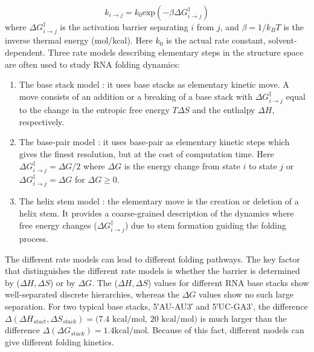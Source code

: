 \begin{equation}
\label{Eq:arrhenius}
k_{i \rightarrow j} = k_0 \text{exp}(-\beta  \Delta G^{\ddagger}_{i\rightarrow j})
\end{equation}
where \(\Delta G^{\ddagger}_{i \rightarrow j}\) is the activation barrier separating \(i\) from \(j\), and \(\beta=1/k_BT\) is the inverse thermal energy (mol/kcal). 
Here \(k_0\) is the actual rate constant, solvent-dependent. Three rate models describing elementary steps in the structure space are often used to study \ac{RNA} folding dynamics: 
\begin{enumerate}
	\item The base stack model \cite{zhang02_rna_hairp_foldin_kinet,zhang2003analyzing,zhang2006exploring}: it uses base stacks as elementary kinetic move. A move consists of an addition or a breaking of a base stack with \(\Delta G^{\ddagger}_{i \rightarrow j}\) equal to the change in the entropic free energy $T\Delta S$ and the enthalpy $\Delta H$, respectively.  
	\item The base-pair model \cite{flamm2000rna,cocco2003slow}: it uses base-pair as elementary kinetic steps which gives the finest resolution, but at the cost of computation time. Here \(\Delta G^{\ddagger}_{i \rightarrow j}= \Delta G/2\) where $\Delta G$ is the energy change from state $i$ to state $j$ or $ \Delta G^{\ddagger}_{i \rightarrow j}= \Delta G$ for $\Delta G \geq 0$.
	\item  The helix stem model \cite{martinez84_rna_foldin_rule, isambert2000modeling}: the elementary move is the creation or deletion of a helix stem. It provides a coarse-grained description of the dynamics where free energy changes (\(\Delta G^{\ddagger}_{i \rightarrow j}\)) due to stem formation guiding the folding process. 
\end{enumerate}

The different rate models can lead to different folding pathways. The key factor that distinguishes the different rate models is whether the barrier is determined by ($\Delta H, \Delta S$) or by $\Delta G$. The  ($\Delta H, \Delta S$) values for different \ac{RNA} base stacks show well-separated discrete hierarchies, whereas the $\Delta G$ values show no such large separation. For two typical base stacks, 5′AU-AU3′ and 5′UC-GA3', the difference $ \Delta (\Delta H_{stact}, \Delta S_{stack}) = (7.4 \text{ kcal/mol}$, $20 \text{ kcal/mol})$ is much larger than the difference  $\Delta (\Delta G_{stack})=1.4 \text{kcal/mol}$\cite{serra199511}. Because of this fact, different models can give different folding kinetics.

